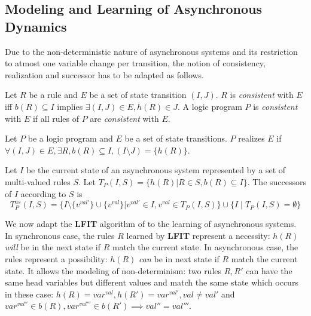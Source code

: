 \subsection{Modeling and Learning of Asynchronous Dynamics}\label{sec:alfit}

Due to the non-deterministic nature of asynchronous systems and its restriction to atmost one variable change per transition,
the notion of consistency, realization and successor has to be adapted as follows.

\begin{definition}[Consistency]
	Let $R$ be a rule and $E$ be a set of state transition $(I,J)$.
	$R$ is {\it consistent} with $E$ iff
	$b(R)\subseteq I$ implies $\exists (I,J) \in E, h(R) \in J$.
	A logic program $P$ is {\it consistent} with $E$ if all rules of $P$ are {\it consistent} with $E$.
\end{definition}

\begin{definition}
	Let $P$ be a logic program and $E$ be a set of state transitions.
	$P$ realizes $E$ if $\forall (I,J) \in E, \exists R, b(R) \subseteq I, (I \setminus J) = \{h(R)\}$.
\end{definition}

\begin{definition}
	Let $I$ be the current state of an asynchronous system represented by a set of multi-valued rules $S$.
	Let $T_P(I,S) = \{h(R) | R \in S, b(R) \subseteq I\}$.
	The successors of $I$ according to $S$ is
	$$T_P^{as}(I,S) = \{I \setminus \{v^{val'}\} \cup \{v^{val}\} | v^{val'} \in I, v^{val} \in T_P(I,S)\} \cup \{I \mid T_P(I,S) = \emptyset\}$$ %
\end{definition}

We now adapt the {\bf LFIT} algorithm of \cite{ribeiro2015learning} to the learning of asynchronous systems.
In synchronous case, the rules $R$ learned by {\bf LFIT} represent a necessity: $h(R)$ \textit{will} be in the next state if $R$ match the current state.
In asynchronous case, the rules represent a possibility: $h(R)$ \textit{can} be in next state if $R$ match the current state.
It allows the modeling of non-determinism: two rules $R, R'$ can have the same head variables but different values and match the same state which occurs in these case:
$h(R)=var^{val}, h(R')=var^{val'}, val \neq val'$ and $var^{val''} \in b(R), var^{val'''}\in b(R') \implies val'' = val'''$.

